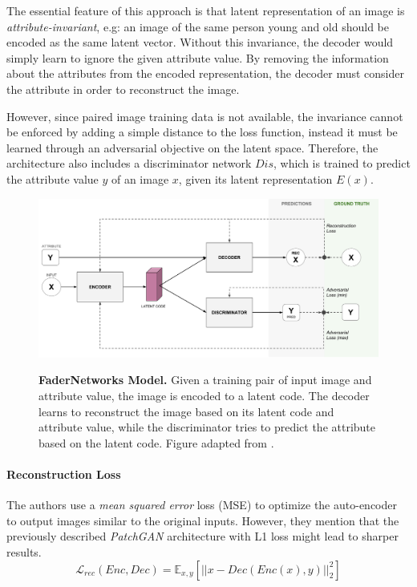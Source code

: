 \documentclass{article}
\begin{document}
The essential feature of this approach is that latent representation of an image is \textit{attribute-invariant}, e.g: an image of the same person young and old should be encoded as the same latent vector. Without this invariance, the decoder would simply learn to ignore the given attribute value. By removing the information about the attributes from the encoded representation, the decoder must consider the attribute in order to reconstruct the image.

However, since paired image training data is not available, the invariance cannot be enforced by adding a simple distance to the loss function, instead it must be learned through an adversarial objective on the latent space. Therefore, the architecture also includes a discriminator network $Dis$, which is trained to predict the attribute value $y$ of an image $x$, given its latent representation $E(x)$.

\begin{figure}[h]
\centering
{\includegraphics[width=\linewidth]{GAN/fader}}
\caption{\label{fig:fader_ex} \textbf{FaderNetworks Model.} Given a training pair of input image and attribute value, the image is encoded to a latent code. The decoder learns to reconstruct the image based on its latent code and attribute value, while the discriminator tries to predict the attribute based on the latent code. Figure adapted from \cite{lample_fader_2017}.}
\end{figure}


\paragraph{Reconstruction Loss}
The authors use a \textit{mean squared error} loss (MSE) to optimize the auto-encoder to output images similar to the original inputs. However, they mention that the previously described \textit{PatchGAN} architecture with L1 loss might lead to sharper results.
\begin{equation}
\mathcal{L}_{rec}(Enc,Dec) = \mathbb{E}_{x,y}[||x-Dec(Enc(x),y)||^2_2]
\end{equation}
\end{document}
